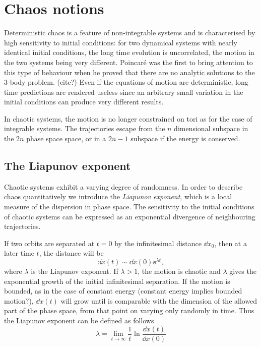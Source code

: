 \documentclass[../thesis.tex]{subfiles}
\theoremstyle{plain}
\begin{document}
\section{Chaos notions}

Deterministic chaos is a feature of non-integrable systems and is characterised
by high sensitivity to initial conditions: for two dynamical systems with
nearly identical initial conditions, the long time evolution is uncorrelated,
the motion in the two systems being very different.
Poincaré was the first to bring attention to this type of behaviour when he
proved that there are no analytic solutions to the 3-body problem. ({\color{red}cite?})
Even if the equations of motion are deterministic, long time predictions are
rendered useless since an arbitrary small variation in the initial conditions
can produce very different results.

In chaotic systems, the motion is no longer constrained on tori as for the case
of integrable systems. The trajectories escape from the \(n\) dimensional subspace
in the \(2n\) phase space space, or in a \(2n-1\) subspace if the energy is
conserved.


\subsection{The Liapunov exponent}

Chaotic systems exhibit a varying degree of randomness. In order to describe
chaos quantitatively we introduce the \emph{Liapunov exponent}, which is a local measure
of the dispersion in phase space.
The sensitivity to the initial conditions of chaotic systems can be expressed
as an exponential divergence of neighbouring trajectories.

If two orbits are separated at \(t=0\) by the infinitesimal distance \(\dd{x_0}\),
then at a later time \(t\), the distance will be
\[
  \dd{x}(t) \sim \dd{x}(0) \ee^{\lambda t},
\]
where \(\lambda \) is the Liapunov exponent.
If \(\lambda > 1\), the motion is chaotic and \(\lambda \) gives the exponential
growth of the initial infinitesimal separation. If the motion is bounded, as in
the case of constant energy {\color{red} (constant energy implies bounded motion?)},
\(\dd{x}(t)\) will grow until is comparable with the dimension of the
allowed part of the phase space, from that point on varying only randomly in time.
Thus the Liapunov exponent can be defined as follows
\begin{equation}
  \label{eq:liapunov}
  \lambda = \lim_{t \to \infty} \frac{1}{t} \ln{\frac{\dd{x}(t)}{\dd{x}(0)}}
\end{equation}
\end{document}

